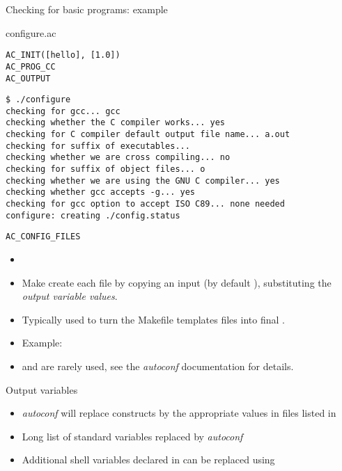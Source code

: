 \begin{frame}[fragile]{Checking for basic programs: example}

\begin{block}{configure.ac}
\begin{verbatim}
AC_INIT([hello], [1.0])
AC_PROG_CC
AC_OUTPUT
\end{verbatim}
\end{block}

\begin{block}{}
\begin{verbatim}
$ ./configure
checking for gcc... gcc
checking whether the C compiler works... yes
checking for C compiler default output file name... a.out
checking for suffix of executables...
checking whether we are cross compiling... no
checking for suffix of object files... o
checking whether we are using the GNU C compiler... yes
checking whether gcc accepts -g... yes
checking for gcc option to accept ISO C89... none needed
configure: creating ./config.status
\end{verbatim}
\end{block}

\end{frame}

\begin{frame}{{\tt AC\_CONFIG\_FILES}}
  \begin{itemize}
  \item {}
  \item Make  create each file by copying an input
     (by default ), substituting the {\em
      output variable values}.
  \item Typically used to turn the Makefile templates
     files into final .
  \item Example:\\
  \item {} and  are rarely used, see the {\em
      autoconf} documentation for details.
  \end{itemize}
\end{frame}

\begin{frame}{Output variables}
  \begin{itemize}
  \item {\em autoconf} will replace  constructs by
    the appropriate values in files listed in 
  \item Long list of standard variables replaced by {\em autoconf}
  \item Additional shell variables declared in  can
    be replaced using 
  \end{itemize}
\end{frame}

